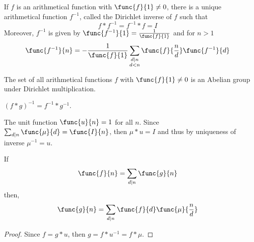 \begin{theorem}
    If \(f\) is an arithmetical function with \(\func{f}{1} \neq 0\), there is a unique arithmetical function \(f^{-1}\), called the Dirichlet inverse of \(f\) such that
    \begin{equation*}
        f \ast f^{-1} = f^{-1} \ast f = I
    \end{equation*}
    Moreover, \(f^{-1}\) is given by \(\func{f^{-1}}{1} = \frac{1}{\func{f}{1}}\) and for \(n > 1\)
    \begin{equation*}
        \func{f^{-1}}{n} = -\frac{1}{\func{f}{1}} \sum_{\substack{d \mid n \\ d < n}} \func{f}{\frac{n}{d}} \func{f^{-1}}{d}
    \end{equation*}
\end{theorem}

\begin{remark}
    The set of all arithmetical functions \(f\) with \(\func{f}{1} \neq 0\) is an Abelian group under Dirichlet multiplication.
\end{remark}

\begin{proposition}
    \((f \ast g)^{-1} = f^{-1} \ast g^{-1}\).
\end{proposition}
\begin{definition}
    The unit function \(\func{u}{n} = 1\) for all \(n\). Since \(\sum_{d \mid n} \func{\mu}{d} = \func{I}{n}\), then \(\mu \ast u = I\) and thus by uniqueness of inverse \(\mu^{-1} = u\).
\end{definition}

\begin{theorem}
    If 
    \begin{equation*}
        \func{f}{n} = \sum_{d \mid n} \func{g}{n} 
    \end{equation*}
    then, 
    \begin{equation}
        \func{g}{n} = \sum_{d \mid n} \func{f}{d} \func{\mu}{\frac{n}{d}}
    \end{equation}
\end{theorem}
\begin{proof}
    Since \(f = g \ast u\), then \(g = f \ast u^{-1} = f \ast \mu\).
\end{proof}
